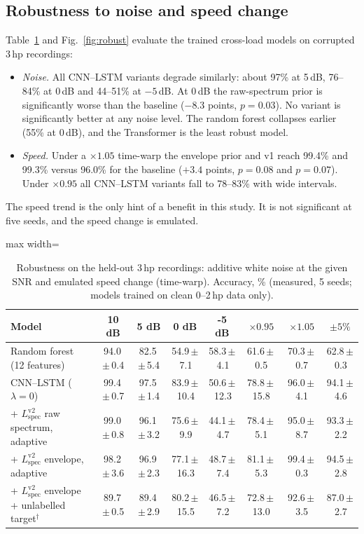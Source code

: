 \documentclass[conference]{IEEEtran}
\begin{document}
\subsection{Robustness to noise and speed change}
Table~\ref{tab:robust} and Fig.~\ref{fig:robust} evaluate the trained
cross-load models on corrupted 3\,hp recordings:
\begin{itemize}
\item \emph{Noise.} All CNN--LSTM variants degrade similarly: about 97\% at
5\,dB, 76--84\% at 0\,dB and 44--51\% at $-5$\,dB. At 0\,dB the raw-spectrum
prior is significantly worse than the baseline ($-8.3$ points, $p=0.03$). No
variant is significantly better at any noise level. The random forest
collapses earlier (55\% at 0\,dB), and the Transformer is the least robust
model.
\item \emph{Speed.} Under a $\times1.05$ time-warp the envelope prior and v1
reach 99.4\% and 99.3\% versus 96.0\% for the baseline ($+3.4$ points,
$p=0.08$ and $p=0.07$). Under $\times0.95$ all CNN--LSTM variants fall to
78--83\% with wide intervals.
\end{itemize}
The speed trend is the only hint of a benefit in this study. It is not
significant at five seeds, and the speed change is emulated.

\begin{table}[t]
\caption{Robustness on the held-out 3\,hp recordings: additive white noise at the given SNR and emulated speed change (time-warp). Accuracy, \% (measured, 5 seeds; models trained on clean 0--2\,hp data only).}
\label{tab:robust}
\centering
\footnotesize
\begin{adjustbox}{max width=\textwidth}
\begin{tabular}{lccccccc}
\toprule
Model & 10 dB & 5 dB & 0 dB & -5 dB & $\times0.95$ & $\times1.05$ & $\pm5\%$ \\
\midrule
Random forest (12 features) & 94.0\,$\pm$\,0.4 & 82.5\,$\pm$\,5.4 & 54.9\,$\pm$\,7.1 & 58.3\,$\pm$\,4.1 & 61.6\,$\pm$\,0.5 & 70.3\,$\pm$\,0.7 & 62.8\,$\pm$\,0.3 \\
CNN--LSTM ($\lambda=0$) & 99.4\,$\pm$\,0.7 & 97.5\,$\pm$\,1.4 & 83.9\,$\pm$\,10.4 & 50.6\,$\pm$\,12.3 & 78.8\,$\pm$\,15.8 & 96.0\,$\pm$\,4.1 & 94.1\,$\pm$\,4.6 \\
+ $L_{\mathrm{spec}}^{\mathrm{v2}}$ raw spectrum, adaptive & 99.0\,$\pm$\,0.8 & 96.1\,$\pm$\,3.2 & 75.6\,$\pm$\,9.9 & 44.1\,$\pm$\,4.7 & 78.4\,$\pm$\,5.1 & 95.0\,$\pm$\,8.7 & 93.3\,$\pm$\,2.2 \\
+ $L_{\mathrm{spec}}^{\mathrm{v2}}$ envelope, adaptive & 98.2\,$\pm$\,3.6 & 96.9\,$\pm$\,2.3 & 77.1\,$\pm$\,16.3 & 48.7\,$\pm$\,7.4 & 81.1\,$\pm$\,5.3 & 99.4\,$\pm$\,0.3 & 94.5\,$\pm$\,2.8 \\
+ $L_{\mathrm{spec}}^{\mathrm{v2}}$ envelope + unlabelled target$^{\dagger}$ & 89.7\,$\pm$\,0.5 & 89.4\,$\pm$\,2.9 & 80.2\,$\pm$\,15.5 & 46.5\,$\pm$\,7.2 & 72.8\,$\pm$\,13.0 & 92.6\,$\pm$\,3.5 & 87.0\,$\pm$\,2.7 \\
\bottomrule
\end{tabular}
\end{adjustbox}
\end{table}
\end{document}
